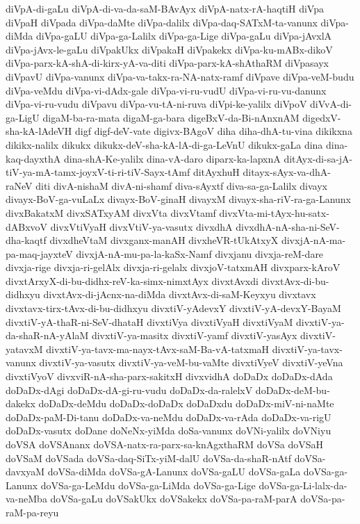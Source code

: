 {diVpA-di-gaLu
diVpA-di-va-da-saM-BAvAyx
diVpA-natx-rA-haqtiH
diVpa
diVpaH
diVpada
diVpa-daMte
diVpa-dalilx
diVpa-daq-SATxM-ta-vanunx
diVpa-diMda
diVpa-gaLU
diVpa-ga-Lalilx
diVpa-ga-Lige
diVpa-gaLu
diVpa-jAvxlA
diVpa-jAvx-le-gaLu
diVpakUkx
diVpakaH
diVpakekx
diVpa-ku-mABx-dikoV
diVpa-parx-kA-shA-di-kirx-yA-va-diti
diVpa-parx-kA-shAthaRM
diVpasayx
diVpavU
diVpa-vanunx
diVpa-va-takx-ra-NA-natx-ramf
diVpave
diVpa-veM-budu
diVpa-veMdu
diVpa-vi-dAdx-gale
diVpa-vi-ru-vudU
diVpa-vi-ru-vu-danunx
diVpa-vi-ru-vudu
diVpavu
diVpa-vu-tA-ni-ruva
diVpi-ke-yalilx
diVpoV
diVvA-di-ga-LigU
digaM-ba-ra-mata
digaM-ga-bara
digeBxV-da-Bi-nAnxnAM
digedxV-sha-kA-lAdeVH
digf
digf-deV-vate
digivx-BAgoV
diha
diha-dhA-tu-vina
dikikxna
dikikx-nalilx
dikukx
dikukx-deV-sha-kA-lA-di-ga-LeVnU
dikukx-gaLa
dina
dina-kaq-dayxthA
dina-shA-Ke-yalilx
dina-vA-daro
diparx-ka-lapxnA
ditAyx-di-sa-jA-tiV-ya-mA-tamx-joyxV-ti-ri-tiV-Sayx-tAmf
ditAyxhuH
ditayx-sAyx-va-dhA-raNeV
diti
divA-nishaM
divA-ni-shamf
diva-sAyxtf
diva-sa-ga-Lalilx
divayx
divayx-BoV-ga-vuLaLx
divayx-BoV-ginaH
divayxM
divayx-sha-riV-ra-ga-Lanunx
divxBakatxM
divxSATxyAM
divxVta
divxVtamf
divxVta-mi-tAyx-hu-satx-dABxvoV
divxVtiVyaH
divxVtiV-ya-vasutx
divxdhA
divxdhA-nA-sha-ni-SeV-dha-kaqtf
divxdheVtaM
divxganx-manAH
divxheVR-tUkAtxyX
divxjA-nA-ma-pa-maq-jayxteV
divxjA-nA-mu-pa-la-kaSx-Namf
divxjanu
divxja-reM-dare
divxja-rige
divxja-ri-gelAlx
divxja-ri-gelalx
divxjoV-tatxmAH
divxparx-kAroV
divxtArxyX-di-bu-didhx-reV-ka-simx-nimxtAyx
divxtAvxdi
divxtAvx-di-bu-didhxyu
divxtAvx-di-jAcnx-na-diMda
divxtAvx-di-saM-Keyxyu
divxtavx
divxtavx-tirx-tAvx-di-bu-didhxyu
divxtiV-yAdevxY
divxtiV-yA-devxY-BayaM
divxtiV-yA-thaR-ni-SeV-dhataH
divxtiVya
divxtiVyaH
divxtiVyaM
divxtiV-ya-da-shaR-nA-yAlaM
divxtiV-ya-masitx
divxtiV-yamf
divxtiV-yasAyx
divxtiV-yatavxM
divxtiV-ya-tavx-ma-nayx-tAvx-saM-Ba-vA-tatxmaH
divxtiV-ya-tavx-vanunx
divxtiV-ya-vasutx
divxtiV-ya-veM-bu-vaMte
divxtiVyeV
divxtiV-yeVna
divxtiVyoV
divxviR-nA-sha-parx-sakitxH
divxvidhA
doDaDx
doDaDx-dAda
doDaDx-dAgi
doDaDx-dA-gi-ru-vudu
doDaDx-da-ralelxV
doDaDx-deM-bu-dakekx
doDaDx-deMdu
doDaDx-doDaDx
doDaDxdu
doDaDx-miV-ni-naMte
doDaDx-paM-Di-tanu
doDaDx-va-neMdu
doDaDx-va-rAda
doDaDx-va-rigU
doDaDx-vasutx
doDane
doNeNx-yiMda
doSa-vanunx
doVNi-yalilx
doVNiyu
doVSA
doVSAnanx
doVSA-natx-ra-parx-sa-knAgxthaRM
doVSa
doVSaH
doVSaM
doVSada
doVSa-daq-SiTx-yiM-dalU
doVSa-da-shaR-nAtf
doVSa-davxyaM
doVSa-diMda
doVSa-gA-Lanunx
doVSa-gaLU
doVSa-gaLa
doVSa-ga-Lanunx
doVSa-ga-LeMdu
doVSa-ga-LiMda
doVSa-ga-Lige
doVSa-ga-Li-lalx-da-va-neMba
doVSa-gaLu
doVSakUkx
doVSakekx
doVSa-pa-raM-parA
doVSa-pa-raM-pa-reyu
}
